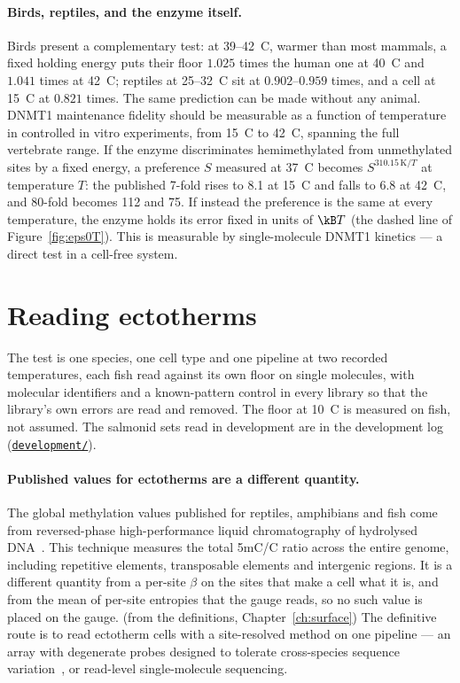 \paragraph{Birds, reptiles, and the enzyme itself.} Birds present a complementary test: at 39--42~\textdegree C, warmer than
most mammals, a fixed holding energy puts their floor $1.025$ times the human one at 40~\textdegree C and $1.041$ times at
42~\textdegree C; reptiles at 25--32~\textdegree C sit at $0.902$--$0.959$ times, and a cell at 15~\textdegree C at
$0.821$ times. \calc{} The same prediction can be made without any animal. DNMT1 maintenance fidelity should be
measurable as a function of temperature in controlled in vitro experiments, from 15~\textdegree C to 42~\textdegree C,
spanning the full vertebrate range. If the enzyme discriminates hemimethylated from unmethylated sites by a fixed energy, a
preference $S$ measured at 37~\textdegree C becomes $S^{310.15\,\mathrm{K}/T}$ at temperature $T$: the published 7-fold rises
to 8.1 at 15~\textdegree C and falls to 6.8 at 42~\textdegree C, and 80-fold becomes 112 and 75. \calc{} If instead the
preference is the same at every temperature, the enzyme holds its error fixed in units of $\kB T$ (the dashed line of
Figure~\ref{fig:eps0T}). This is measurable by single-molecule DNMT1 kinetics --- a direct test in a cell-free system.
\prediction

\section{Reading ectotherms}

The test is one species, one cell type and one pipeline at two recorded temperatures, each fish read against its own floor on single
molecules, with molecular identifiers and a known-pattern control in every library so that the library's own errors are read and removed.
The floor at 10~\textdegree C is measured on fish, not assumed. \prediction{} The salmonid sets read in development are in the
development log (\href{https://github.com/hmahaffeyges/IAM-Validation/tree/main/development}{\texttt{development/}}).

\paragraph{Published values for ectotherms are a different quantity.} The global methylation values published for reptiles,
amphibians and fish come from reversed-phase high-performance liquid chromatography of hydrolysed
DNA~\cite{Varriale2006_fish,Varriale2006_reptile}. This technique measures the total 5mC/C ratio across the entire genome,
including repetitive elements, transposable elements and intergenic regions. \observed{} It is a different quantity from
a per-site $\beta$ on the sites that make a cell what it is, and from the mean of per-site entropies that the gauge reads, so
no such value is placed on the gauge. \derived{} (from the definitions, Chapter~\ref{ch:surface}) The definitive route
is to read ectotherm cells with a site-resolved method on one pipeline --- an array with degenerate probes designed to
tolerate cross-species sequence variation~\cite{Arneson2022}, or read-level single-molecule sequencing.



